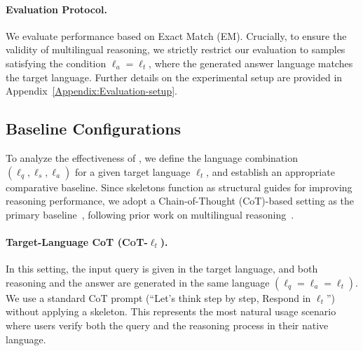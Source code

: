 \paragraph{Evaluation Protocol.} 
We evaluate performance based on Exact Match (EM). Crucially, to ensure the validity of multilingual reasoning, we strictly restrict our evaluation to samples satisfying the condition $\ell_a=\ell_t$, where the generated answer language matches the target language. Further details on the experimental setup are provided in Appendix~\ref{Appendix:Evaluation-setup}.



\subsection{Baseline Configurations}
To analyze the effectiveness of \Lasef, we define the language combination $(\ell_q, \ell_s, \ell_a)$ for a given target language $\ell_t$, and establish an appropriate comparative baseline. Since skeletons function as structural guides for improving reasoning performance, we adopt a Chain-of-Thought (CoT)-based setting as the primary baseline~\citep{cot-neurips2022}, following prior work on multilingual reasoning~\citep{xlt-emnlp2023,clp-emnlp2023}.


\paragraph{Target-Language CoT (\textsc{CoT-$\ell_t$}).} In this setting, the input query is given in the target language, and both reasoning and the answer are generated in the same language $(\ell_q=\ell_a=\ell_t)$. We use a standard CoT prompt (``Let’s think step by step, Respond in {$\ell_t$}'') without applying a skeleton. This represents the most natural usage scenario where users verify both the query and the reasoning process in their native language.

